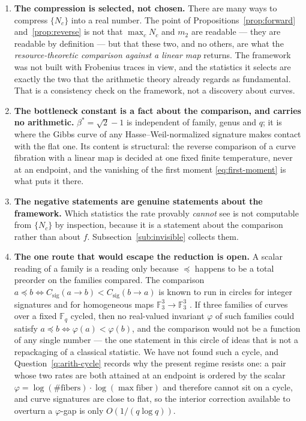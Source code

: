 \documentclass[11pt]{article}
\theoremstyle{definition}
\theoremstyle{plain}
\theoremstyle{remark}
\newcommand{\F}{\mathbb F}
\newcommand{\csig}{C_{\mathrm{sig}}}
\begin{document}
\begin{enumerate}
  \item \textbf{The compression is selected, not chosen.}  There are many ways
  to compress \(\{N_c\}\) into a real number.  The point of
  Propositions~\ref{prop:forward} and~\ref{prop:reverse} is not that
  \(\max_cN_c\) and \(m_2\) are readable --- they are readable by definition ---
  but that these two, and no others, are what the \emph{resource-theoretic
  comparison against a linear map} returns.  The framework was not built with
  Frobenius traces in view, and the statistics it selects are exactly the two
  that the arithmetic theory already regards as fundamental.  That is a
  consistency check on the framework, not a discovery about curves.

  \item \textbf{The bottleneck constant is a fact about the comparison, and
  carries no arithmetic.}  \(\beta^*=\sqrt2-1\) is independent of family, genus
  and \(q\); it is where the Gibbs curve of any Hasse--Weil-normalized signature
  makes contact with the flat one.  Its content is structural: the reverse
  comparison of a curve fibration with a linear map is decided at one fixed
  finite temperature, never at an endpoint, and the vanishing of the first
  moment \eqref{eq:first-moment} is what puts it there.

  \item \textbf{The negative statements are genuine statements about the
  framework.}  Which statistics the rate provably \emph{cannot} see is not
  computable from \(\{N_c\}\) by inspection, because it is a statement about the
  comparison rather than about \(f\).  Subsection~\ref{sub:invisible} collects
  them.

  \item \textbf{The one route that would escape the reduction is open.}  A
  scalar reading of a family is a reading only because \(\preccurlyeq\) happens
  to be a total preorder on the families compared.  The comparison
  \(a\preccurlyeq b\iff \csig(a\to b)<\csig(b\to a)\) is known to run in circles
  for integer signatures and for homogeneous maps \(\F_3^3\to\F_3^3\)
  \cite{vorozhtsov-exchange}.  If three families of curves over a fixed \(\F_q\)
  cycled, then no real-valued invariant \(\varphi\) of such families could
  satisfy \(a\preccurlyeq b\iff\varphi(a)<\varphi(b)\), and the comparison would
  not be a function of any single number --- the one statement in this circle of
  ideas that is not a repackaging of a classical statistic.  We have not found
  such a cycle, and Question~\ref{q:arith-cycle} records why the present regime
  resists one: a pair whose two rates are both attained at an endpoint is
  ordered by the scalar
  \(\varphi=\log(\#\text{fibers})\cdot\log(\max\text{fiber})\) and therefore
  cannot sit on a cycle, and curve signatures are close to flat, so the interior
  correction available to overturn a \(\varphi\)-gap is only \(O(1/(q\log q))\).
\end{enumerate}
\end{document}
